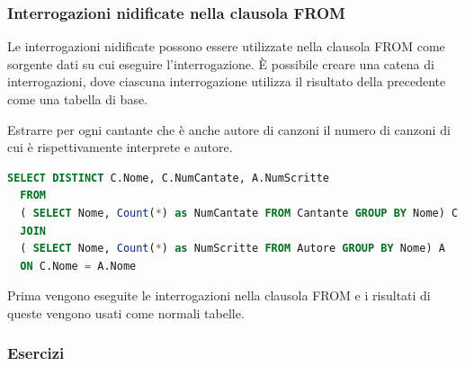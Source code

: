 \documentclass[a4paper,twoside]{article}
\begin{document}
\subsubsection{Interrogazioni nidificate nella clausola FROM}
Le interrogazioni nidificate possono essere utilizzate nella clausola FROM come
sorgente dati su cui eseguire l’interrogazione.
È possibile creare una catena di interrogazioni, dove ciascuna
interrogazione utilizza il risultato della precedente come una
tabella di base.

\begin{example}
  Estrarre per ogni cantante che è anche autore di canzoni il numero
  di canzoni di cui è rispettivamente interprete e autore.
\begin{lstlisting}[language=SQL]
SELECT DISTINCT C.Nome, C.NumCantate, A.NumScritte
  FROM
  ( SELECT Nome, Count(*) as NumCantate FROM Cantante GROUP BY Nome) C
  JOIN
  ( SELECT Nome, Count(*) as NumScritte FROM Autore GROUP BY Nome) A
  ON C.Nome = A.Nome
\end{lstlisting}
  Prima vengono eseguite le interrogazioni nella clausola FROM e i
  risultati di queste vengono usati come normali tabelle.
\end{example}

\subsubsection{Esercizi}
\end{document}
